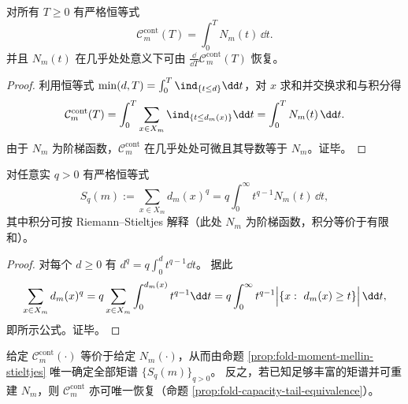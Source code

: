 \begin{proposition}[容量—尾函数等价]\label{prop:fold-capacity-tail-equivalence}
对所有 \(T\ge 0\) 有严格恒等式
\[
\mathcal{C}_m^{\mathrm{cont}}(T)=\int_{0}^{T} N_m(t)\,\dd t.
\]
并且 \(N_m(t)\) 在几乎处处意义下可由 \(\frac{\dd}{\dd T}\mathcal{C}_m^{\mathrm{cont}}(T)\) 恢复。
\end{proposition}

\begin{proof}
利用恒等式 \(\min(d,T)=\int_{0}^{T}\ind_{\{t\le d\}}\dd t\)，对 \(x\) 求和并交换求和与积分得
\[
\mathcal{C}_m^{\mathrm{cont}}(T)=\int_{0}^{T}\sum_{x\in X_m}\ind_{\{t\le d_m(x)\}}\dd t
=\int_{0}^{T}N_m(t)\,\dd t.
\]
由于 \(N_m\) 为阶梯函数，\(\mathcal{C}_m^{\mathrm{cont}}\) 在几乎处处可微且其导数等于 \(N_m\)。证毕。
\end{proof}

\begin{proposition}\label{prop:fold-moment-mellin-stieltjes}
对任意实 \(q>0\) 有严格恒等式
\[
S_q(m):=\sum_{x\in X_m} d_m(x)^q
=q\int_{0}^{\infty} t^{q-1}N_m(t)\,\dd t,
\]
其中积分可按 Riemann--Stieltjes 解释（此处 \(N_m\) 为阶梯函数，积分等价于有限和）。
\end{proposition}

\begin{proof}
对每个 \(d\ge 0\) 有 \(d^q=q\int_{0}^{d}t^{q-1}\dd t\)。
据此
\[
\sum_{x\in X_m}d_m(x)^q
=q\sum_{x\in X_m}\int_{0}^{d_m(x)} t^{q-1}\dd t
=q\int_{0}^{\infty} t^{q-1}\Bigl|\{x:\ d_m(x)\ge t\}\Bigr|\,\dd t,
\]
即所示公式。证毕。
\end{proof}

\begin{corollary}\label{cor:fold-capacity-moment-completeness}
给定 \(\mathcal{C}_m^{\mathrm{cont}}(\cdot)\) 等价于给定 \(N_m(\cdot)\)，从而由命题 \ref{prop:fold-moment-mellin-stieltjes} 唯一确定全部矩谱 \(\{S_q(m)\}_{q>0}\)。
反之，若已知足够丰富的矩谱并可重建 \(N_m\)，则 \(\mathcal{C}_m^{\mathrm{cont}}\) 亦可唯一恢复（命题 \ref{prop:fold-capacity-tail-equivalence}）。
\end{corollary}




